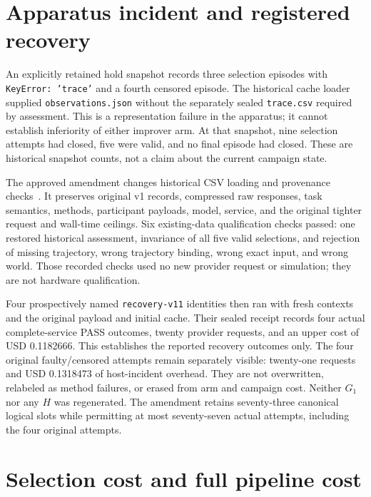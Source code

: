 \section{Apparatus incident and registered recovery}

An explicitly retained hold snapshot records three selection episodes with
\texttt{KeyError: 'trace'} and a fourth censored episode. The historical cache
loader supplied \texttt{observations.json} without the separately sealed
\texttt{trace.csv} required by assessment. This is a representation failure in
the apparatus; it cannot establish inferiority of either improver arm. At
that snapshot, nine selection attempts had closed, five were valid, and no
final episode had closed. These are historical snapshot counts, not a claim
about the current campaign state.

The approved amendment changes historical CSV loading and provenance
checks~\cite{amendment}.
It preserves original v1 records, compressed raw responses, task semantics,
methods, participant payloads, model, service, and the original tighter request
and wall-time ceilings. Six existing-data qualification checks passed: one
restored historical assessment, invariance of all five valid selections, and
rejection of missing trajectory, wrong trajectory binding, wrong exact input,
and wrong world. Those recorded checks used no new provider request or
simulation; they are not hardware qualification.

Four prospectively named \texttt{recovery-v11} identities then ran with fresh
contexts and the original payload and initial cache. Their sealed receipt
records four actual complete-service PASS outcomes, twenty provider requests,
and an upper cost of USD 0.1182666. This establishes the reported recovery
outcomes only. The four original faulty/censored attempts remain separately
visible: twenty-one requests and USD 0.1318473 of host-incident overhead. They
are not overwritten, relabeled as method failures, or erased from arm and
campaign cost. Neither $G_1$ nor any $H$ was regenerated. The amendment retains
seventy-three canonical logical slots while permitting at most seventy-seven
actual attempts, including the four original attempts.

\section{Selection cost and full pipeline cost}

